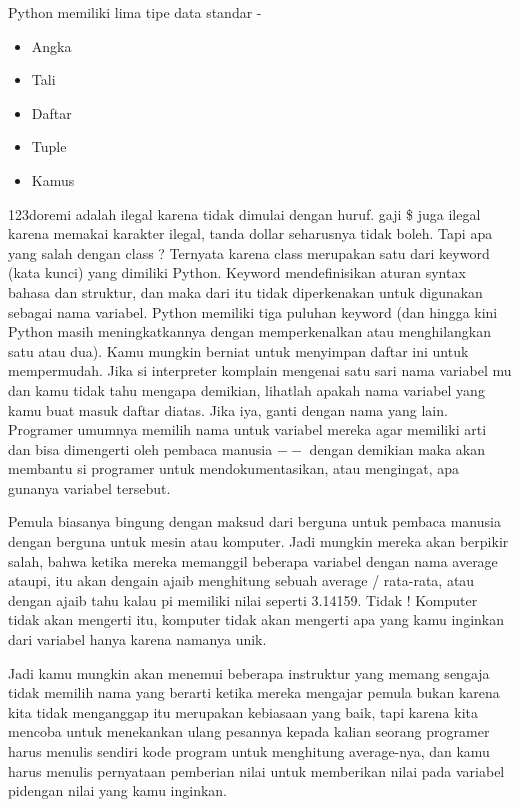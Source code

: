 Python memiliki lima tipe data standar -
\begin{itemize}
	\item Angka
	\item Tali
	\item Daftar
	\item Tuple
	\item Kamus
\end{itemize}
123doremi adalah ilegal karena tidak dimulai dengan huruf. gaji \$ juga ilegal karena memakai karakter ilegal, tanda dollar seharusnya tidak boleh. Tapi apa yang salah dengan class ?
Ternyata karena class merupakan satu dari keyword (kata kunci) yang dimiliki Python. Keyword mendefinisikan aturan syntax bahasa dan struktur, dan maka dari itu tidak diperkenakan untuk digunakan sebagai nama variabel. 
Python memiliki tiga puluhan keyword (dan hingga kini Python masih meningkatkannya dengan memperkenalkan atau menghilangkan satu atau dua). 
Kamu mungkin berniat untuk menyimpan daftar ini untuk mempermudah. Jika si interpreter komplain mengenai satu sari nama variabel mu dan kamu tidak tahu mengapa demikian, lihatlah apakah nama variabel yang kamu buat masuk daftar diatas. Jika iya, ganti dengan nama yang lain.  
Programer umumnya memilih nama untuk variabel mereka agar memiliki arti dan bisa dimengerti oleh pembaca manusia \(--\) dengan demikian maka akan membantu si programer untuk mendokumentasikan, atau mengingat, apa gunanya variabel tersebut.  

Pemula biasanya bingung dengan maksud dari berguna untuk pembaca manusia dengan berguna untuk mesin atau komputer. Jadi mungkin mereka akan berpikir salah, bahwa ketika mereka memanggil beberapa variabel dengan nama average ataupi, itu akan dengain ajaib menghitung sebuah average / rata-rata, atau dengan ajaib tahu kalau pi memiliki nilai seperti 3.14159. Tidak ! Komputer tidak akan mengerti itu, komputer tidak akan mengerti apa yang kamu inginkan dari variabel hanya karena namanya unik. 

Jadi kamu mungkin akan menemui beberapa instruktur yang memang sengaja tidak memilih nama yang berarti ketika mereka mengajar pemula bukan karena kita tidak menganggap itu merupakan kebiasaan yang baik, tapi karena kita mencoba untuk menekankan ulang pesannya kepada kalian seorang programer  harus menulis sendiri kode program untuk menghitung average-nya, dan kamu harus menulis pernyataan pemberian nilai untuk memberikan nilai pada variabel pidengan nilai yang kamu inginkan. 


